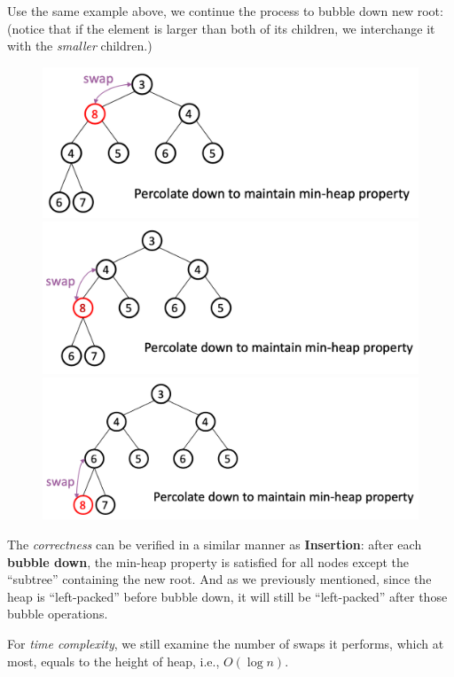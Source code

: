 \begin{spacing}{1.3}
    Use the same example above, we continue the process to bubble down new root:
    (notice that if the element is larger than both of its children, 
    we interchange it with the {\it smaller} children.)
    \begin{figure}[htbp]
        \centering
        \includegraphics[scale=0.3]{images/05-min-3.png}\qquad
        \includegraphics[scale=0.3]{images/05-min-4.png}\qquad 
        \includegraphics[scale=0.3]{images/05-min-5.png}
    \end{figure}
    
    The {\it correctness} can be verified in a similar manner as {\bf Insertion}:
    after each {\bf bubble down}, the min-heap property is satisfied for all
    nodes except the ``subtree'' containing the new root. And as we previously 
    mentioned, since the heap is ``left-packed'' before bubble down, 
    it will still be ``left-packed'' after those bubble operations.

    For {\it time complexity}, we still examine the number of swaps it performs,
    which at most, equals to the height of heap, i.e., $O(\log n)$.



\end{spacing}
